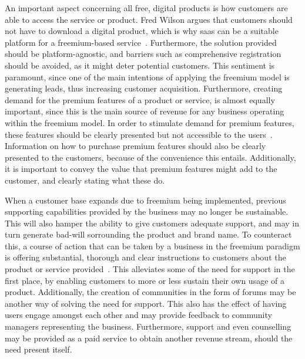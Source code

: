 \begin{itemize}
\end{itemize}


An important aspect concerning all free, digital products is how customers are able to access the service or product. Fred Wilson argues that customers should not have to download a digital product, which is why \gls{saas} can be a suitable platform for a freemium-based service~\cite{fredwilson20061}. Furthermore, the solution provided should be platform-agnostic, and barriers such as comprehensive registration should be avoided, as it might deter potential customers. This sentiment is paramount, since one of the main intentions of applying the freemium model is generating leads, thus increasing customer acquisition. Furthermore, creating demand for the premium features of a product or service, is almost equally important, since this is the main source of revenue for any business operating within the freemium model. In order to stimulate demand for premium features, these features should be clearly presented but not accessible to the users~\cite{bogdanpopescu2008}. Information on how to purchase premium features should also be clearly presented to the customers, because of the convenience this entails. Additionally, it is important to convey the value that premium features might add to the customer, and clearly stating what these do. 


When a customer base expands due to freemium being implemented, previous supporting capabilities provided by the business may no longer be sustainable. This will also hamper the ability to give customers adequate support, and may in turn generate bad-will sorrounding the product and brand name. To counteract this, a course of action that can be taken by a business in the freemium paradigm is offering substantial, thorough and clear instructions to customers about the product or service provided~\cite{brucehadley2003}. This alleviates some of the need for support in the first place, by enabling customers to more or less sustain their own usage of a product. Additionally, the creation of communities in the form of forums may be another way of solving the need for support. This also has the effect of having users engage amongst each other and may provide feedback to community managers representing the business. Furthermore, support and even counselling may be provided as a paid service to obtain another revenue stream, should the need present itself. 

